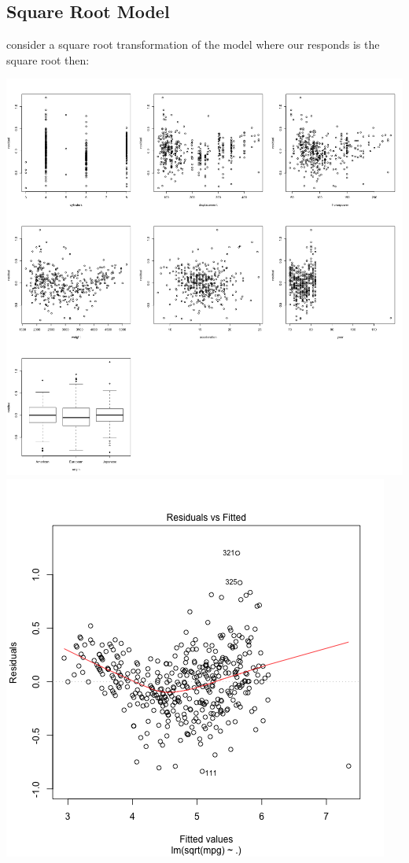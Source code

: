 \documentclass[11pt]{article} %
\begin{document}
\subsection{Square Root Model}
consider a square root transformation of the model where our responds is the square root then:
\begin{center}
\includegraphics[scale=0.13]{sqrt_res_vs_value}
\includegraphics[scale=0.3]{sqrt_res_vs_fitted}
\end{center}
\end{document}

